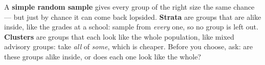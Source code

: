 \documentclass[12pt]{article}
\begin{document}
\vspace{0.14in}

\boxguard[8]
\begin{remindbox}
\small
A \textbf{simple random sample} gives every group of the right size the same chance --- but just
by chance it can come back lopsided. \textbf{Strata} are groups that are alike inside, like the
grades at a school: sample from \emph{every} one, so no group is left out. \textbf{Clusters} are
groups that each look like the whole population, like mixed advisory groups: take \emph{all} of
\emph{some}, which is cheaper. Before you choose, ask: are these groups alike inside, or does
each one look like the whole?
\end{remindbox}
\end{document}
